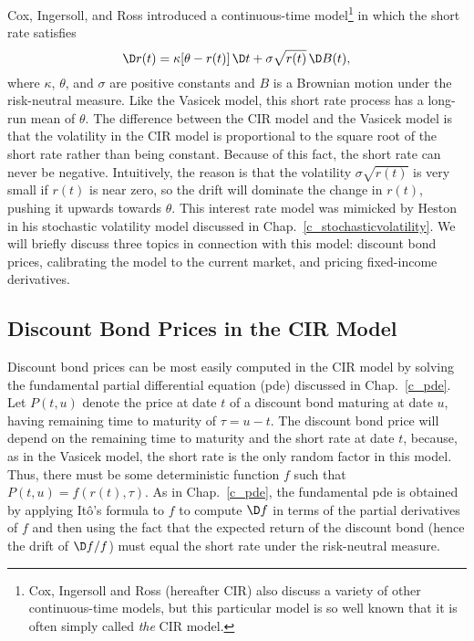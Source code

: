 Cox, Ingersoll, and Ross \cite{CIR} introduced a continuous-time model\footnote{Cox, Ingersoll and Ross (hereafter CIR)
also discuss a variety of other continuous-time models, but this particular model is so
well known that it is often simply called \emph{the} CIR model.}
in which the short
rate satisfies
\begin{equation}\label{cir}
\D r(t)=\kappa [\theta-r(t)]\,\D t+\sigma \sqrt{r(t)}\,\D B(t),
\end{equation} 
where $\kappa$, $\theta$, and $\sigma$ are positive constants  and $B$ is  a Brownian motion under the risk-neutral measure.  Like the Vasicek model,
this short rate process has a long-run mean of $\theta$.  The
difference between the CIR model and the Vasicek model is that the volatility in the CIR model is proportional to the square root of the short
rate rather than being constant.  Because of this fact, the short rate can never be
negative.  Intuitively, the reason is that the volatility $\sigma\sqrt{r(t)}$ is very small if $r(t)$ is near zero, so the drift will 
dominate the change in $r(t)$, pushing it upwards 
towards $\theta$.  This interest rate model was mimicked by Heston \cite{Heston} in his stochastic volatility model discussed in Chap.~\ref{c_stochasticvolatility}.  We will briefly discuss three topics in connection with this model: discount bond prices, calibrating the model to the current market, and pricing fixed-income derivatives.

\subsection*{Discount Bond Prices in the CIR Model}

Discount bond prices can be most easily computed in the CIR model by solving the fundamental partial differential equation (pde) discussed in Chap.~\ref{c_pde}.  Let $P(t,u)$ denote the price at date $t$ of a discount bond maturing at date $u$, having remaining time to maturity of $\tau = u-t$.  The discount bond price will depend on the remaining time to maturity and the short rate at date $t$, because, as in the Vasicek model, the short rate is the only random factor in this model.  Thus, there must be some deterministic function $f$ such that $P(t,u) = f(r(t),\tau).$  As in Chap.~\ref{c_pde}, the fundamental pde is obtained by applying It\^o's formula to $f$ to compute $\D f$ in terms of the partial derivatives of $f$ and then using the fact that the expected return of the discount bond (hence the drift of $\D f/f$) must equal the short rate under the risk-neutral measure.

